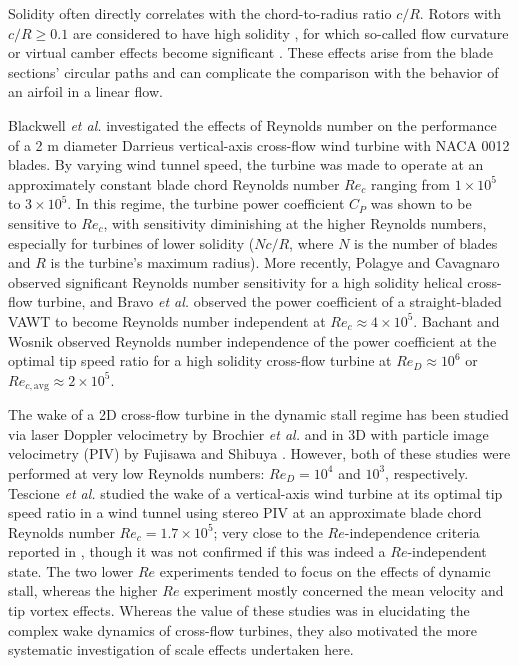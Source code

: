 \documentclass[energies,article,accept,moreauthors,pdftex,10pt,a4paper]{mdpi}
\theoremstyle{mdpi}
\newcounter{ex}
\newcounter{re}
\begin{document}
Solidity often directly correlates with the chord-to-radius ratio $c/R$. Rotors
with $c/R \ge 0.1$ are considered to have high solidity \cite{Fiedler2009}, for which
so-called flow curvature or virtual camber effects become significant
\cite{Migliore1980}. These effects arise from the blade sections' circular
paths and can complicate the comparison with the behavior of an airfoil in a linear
flow.

Blackwell \emph{et al.} \cite{Blackwell1976} investigated the effects of
Reynolds number on the performance of a 2 m diameter Darrieus vertical-axis
cross-flow wind turbine with NACA 0012 blades. By varying wind tunnel speed, the
turbine was made to operate at an approximately constant blade chord Reynolds
number $Re_c$ ranging from $1 \times 10^5$ to $3 \times 10^5$. In this regime,
the turbine power coefficient $C_P$ was shown to be sensitive to $Re_c$, with
sensitivity diminishing at the higher Reynolds numbers, especially for turbines
of lower solidity ($Nc/R$, where $N$ is the number of blades and $R$ is the
turbine's maximum radius). More recently, Polagye and Cavagnaro
\cite{Polagye2013b} observed significant Reynolds number sensitivity for a high
solidity helical cross-flow turbine, and Bravo \emph{et al.} \cite{Bravo2007}
observed the power coefficient of a straight-bladed VAWT to become Reynolds
number independent at $Re_c \approx 4 \times 10^5$. Bachant and Wosnik
\cite{Bachant2014} observed Reynolds number independence of the power
coefficient at the optimal tip speed ratio for a high solidity cross-flow
turbine at $Re_D \approx 10^6$ or $Re_{c,\mathrm{avg}} \approx 2 \times 10^5$.

The wake of a 2D cross-flow turbine in the dynamic stall regime has been
studied via laser Doppler velocimetry by Brochier \emph{et al.} \cite{Brochier1986} and
in 3D with particle image velocimetry (PIV) by Fujisawa and Shibuya
\cite{Fujisawa2001}. However, both of these studies were performed at very low
Reynolds numbers: $Re_D = 10^4$ and $10^3$, respectively. Tescione \emph{et al.}
\cite{Tescione2014} studied the wake of a vertical-axis wind turbine at its optimal
tip speed ratio in a wind tunnel using stereo PIV at an approximate blade chord
Reynolds number $Re_c = 1.7 \times 10^5$; very close to the $Re$-independence
criteria reported in \cite{Bachant2014}, though it was not confirmed if this was
indeed a $Re$-independent state. The two lower $Re$ experiments tended to focus
on the effects of dynamic stall, whereas the higher $Re$ experiment mostly
concerned the mean velocity and tip vortex effects. Whereas the value of these
studies was in elucidating the complex wake dynamics of cross-flow turbines,
they also motivated the more systematic investigation of scale effects
undertaken here.
\end{document}
